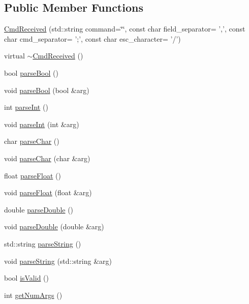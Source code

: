 \subsection*{Public Member Functions}
\begin{DoxyCompactItemize}
\item 
\hyperlink{classcmd_1_1_cmd_received_a4e2d67c5a9de708c11c35a5ea2b5868a}{Cmd\+Received} (std\+::string command=\char`\"{}\char`\"{}, const char field\+\_\+separator= ',', const char cmd\+\_\+separator= ';', const char esc\+\_\+character= '/')
\item 
virtual \hyperlink{classcmd_1_1_cmd_received_aae3a60edebca81eccf26c132abd334bd}{$\sim$\+Cmd\+Received} ()
\item 
bool \hyperlink{classcmd_1_1_cmd_received_a09f6f7766f89968785c3525e3ce8a625}{parse\+Bool} ()
\item 
void \hyperlink{classcmd_1_1_cmd_received_a5f2ae1ffa5dd5312ec12c6e9a46ff24b}{parse\+Bool} (bool \&arg)
\item 
int \hyperlink{classcmd_1_1_cmd_received_a267e265e7bdf5f5e45c1153d78ca0223}{parse\+Int} ()
\item 
void \hyperlink{classcmd_1_1_cmd_received_a8bb8b048253bee5f092d9edd67f8b981}{parse\+Int} (int \&arg)
\item 
char \hyperlink{classcmd_1_1_cmd_received_a7f97a4443af5819d8bcd69e5c51cc4f0}{parse\+Char} ()
\item 
void \hyperlink{classcmd_1_1_cmd_received_a842709f94d709973b62bbd74320825a5}{parse\+Char} (char \&arg)
\item 
float \hyperlink{classcmd_1_1_cmd_received_ac29ede9c4b16e3a768b942a602c72f30}{parse\+Float} ()
\item 
void \hyperlink{classcmd_1_1_cmd_received_a6194b57482cf2f9e235821f03c364496}{parse\+Float} (float \&arg)
\item 
double \hyperlink{classcmd_1_1_cmd_received_a181d947566bb4a9e21725a4e99588c1f}{parse\+Double} ()
\item 
void \hyperlink{classcmd_1_1_cmd_received_a8866107ea61e761416948066b428e54f}{parse\+Double} (double \&arg)
\item 
std\+::string \hyperlink{classcmd_1_1_cmd_received_adf3bc587f2a9b3007b4a5e447116a871}{parse\+String} ()
\item 
void \hyperlink{classcmd_1_1_cmd_received_ad0a14bef5f41acdbe3dba8369fdc015a}{parse\+String} (std\+::string \&arg)
\item 
bool \hyperlink{classcmd_1_1_cmd_received_aff6110aee1a7f6f4f4c0d1542e6cec44}{is\+Valid} ()
\item 
int \hyperlink{classcmd_1_1_cmd_received_af5b660106fb59805494bbb733d1ca5ff}{get\+Num\+Args} ()
\end{DoxyCompactItemize}


